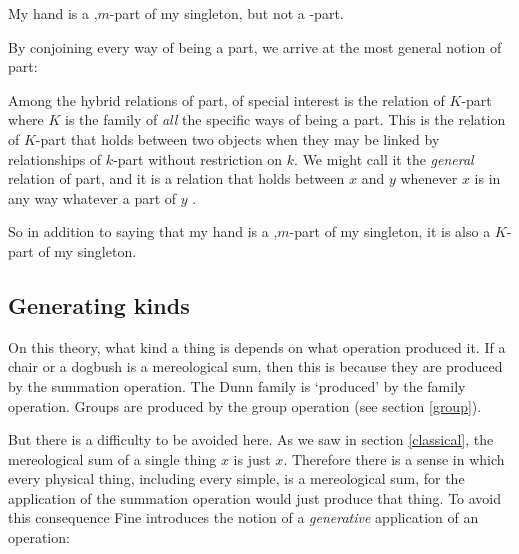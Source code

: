 \documentclass[11pt]{article}
\newenvironment{squote}{%
\begin{spacing}{1}
\begin{list}{}{%
\setlength{\labelwidth}{0pt}%
\rightmargin\leftmargin%
}
\item\relax
}{%
\end{list}%
\end{spacing}
}
\begin{document}
\begin{spacing}{1.5}
My hand is a \textepsilon ,$m$-part of my singleton, but not a
\textepsilon -part.

By conjoining every way of being a part, we arrive at the most general
notion of part:

\begin{squote}
Among the hybrid relations of part, of special interest is the
relation of $K$-part where $K$ is the family of {\em all} the specific
ways of being a part.  This is the relation of $K$-part that holds
between two objects when they may be linked by relationships of
$k$-part without restriction on $k$.  We might call it the {\em
  general} relation of part, and it is a relation that holds between
$x$ and $y$ whenever $x$ is in any way whatever a part of $y$
\citep[580]{fine2010}.
\end{squote}

So in addition to saying that my hand is a \textepsilon ,$m$-part of
my singleton, it is also a $K$-part of my singleton.


\subsection{Generating kinds}
\label{generate}
On this theory, what kind a thing is depends on what operation
produced it.  If a chair or a dogbush is a mereological sum, then this
is because they are produced by the summation operation.  The Dunn
family is `produced' by the family operation.  Groups are produced by
the group operation (see section \ref{group}).

But there is a difficulty to be avoided here.  As we saw in section
\ref{classical}, the mereological sum of a single thing $x$ is just
$x$.  Therefore there is a sense in which every physical thing,
including every simple, is a mereological sum, for the application of
the summation operation would just produce that thing.  To avoid this
consequence Fine introduces the notion of a {\em generative}
application of an operation:


\end{spacing}
\end{document}
